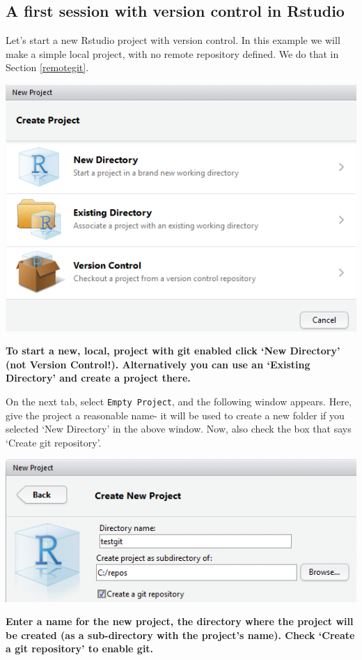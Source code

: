 \documentclass[]{book}
\begin{document}
\hypertarget{firstgitsession}{%
\subsection{A first session with version control in Rstudio}\label{firstgitsession}}

Let's start a new Rstudio project with version control. In this example we will make a simple local project, with no remote repository defined. We do that in Section \ref{remotegit}.

\includegraphics[width=0.75\linewidth]{screenshots/versioncontrolproject}

\textbf{To start a new, local, project with git enabled click `New Directory' (not Version Control!). Alternatively you can use an `Existing Directory' and create a project there.}

On the next tab, select \texttt{Empty\ Project}, and the following window appears. Here, give the project a reasonable name- it will be used to create a new folder if you selected `New Directory' in the above window. Now, also check the box that says `Create git repository'.

\includegraphics[width=0.75\linewidth]{screenshots/gitnewproject}

\textbf{Enter a name for the new project, the directory where the project will be created (as a sub-directory with the project's name). Check `Create a git repository' to enable git.}
\end{document}
